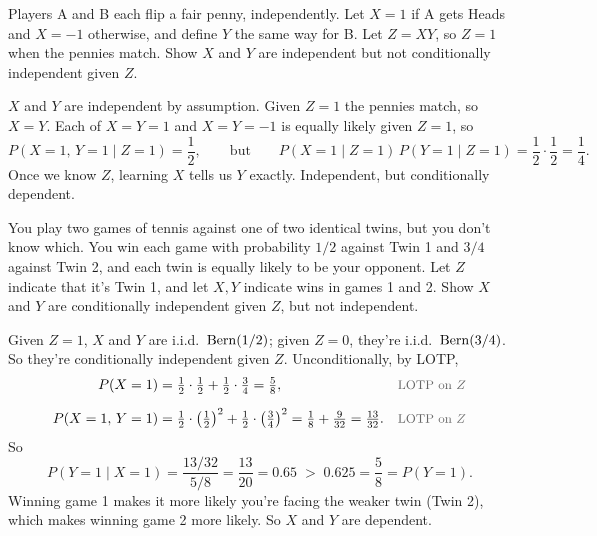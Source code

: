 \bigskip

\begin{example}\label{ex:pennies}
Players A and B each flip a fair penny, independently. Let $X = 1$ if A gets Heads and $X = -1$ otherwise, and define $Y$ the same way for B. Let $Z = XY$, so $Z = 1$ when the pennies match. Show $X$ and $Y$ are independent but not conditionally independent given $Z$.
\end{example}

\medskip

\begin{solution}
$X$ and $Y$ are independent by assumption. Given $Z = 1$ the pennies match, so $X = Y$. Each of $X = Y = 1$ and $X = Y = -1$ is equally likely given $Z = 1$, so
\medskip
\[
P(X = 1,\, Y = 1 \mid Z = 1) = \frac{1}{2},
\qquad \text{but} \qquad
P(X = 1 \mid Z = 1)\,P(Y = 1 \mid Z = 1) = \frac{1}{2} \cdot \frac{1}{2} = \frac{1}{4}.
\]
\medskip
Once we know $Z$, learning $X$ tells us $Y$ exactly. Independent, but conditionally dependent.
\end{solution}

\bigskip

\begin{example}\label{ex:opponent}
You play two games of tennis against one of two identical twins, but you don't know which. You win each game with probability $1/2$ against Twin 1 and $3/4$ against Twin 2, and each twin is equally likely to be your opponent. Let $Z$ indicate that it's Twin 1, and let $X, Y$ indicate wins in games 1 and 2. Show $X$ and $Y$ are conditionally independent given $Z$, but not independent.
\end{example}

\medskip

\begin{solution}
Given $Z = 1$, $X$ and $Y$ are i.i.d.\ $\operatorname{Bern}(1/2)$; given $Z = 0$, they're i.i.d.\ $\operatorname{Bern}(3/4)$. So they're conditionally independent given $Z$. Unconditionally, by LOTP,
\medskip
\begin{align*}
P(X = 1) &= \tfrac{1}{2} \cdot \tfrac{1}{2} + \tfrac{1}{2} \cdot \tfrac{3}{4} = \tfrac{5}{8},
  && \by{LOTP on $Z$} \\[0.6em]
P(X = 1,\, Y = 1) &= \tfrac{1}{2} \cdot \left(\tfrac{1}{2}\right)^{2} + \tfrac{1}{2} \cdot \left(\tfrac{3}{4}\right)^{2} = \tfrac{1}{8} + \tfrac{9}{32} = \tfrac{13}{32}.
  && \by{LOTP on $Z$}
\end{align*}
\medskip
So
\medskip
\[
P(Y = 1 \mid X = 1) = \frac{13/32}{5/8} = \frac{13}{20} = 0.65 \;>\; 0.625 = \frac{5}{8} = P(Y = 1).
\]
\medskip
Winning game 1 makes it more likely you're facing the weaker twin (Twin 2), which makes winning game 2 more likely. So $X$ and $Y$ are dependent.
\end{solution}

